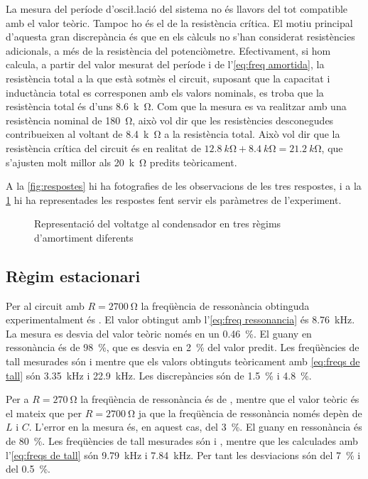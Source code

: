 La mesura del període d'osci\l.lació del sistema no és llavors del tot compatible amb el valor teòric. Tampoc ho és el de la resistència crítica. El motiu principal d'aquesta gran discrepància és que en els càlculs no s'han considerat resistències adicionals, a més de la resistència del potenciòmetre. Efectivament, si hom calcula, a partir del valor mesurat del període i de l'\cref{eq:freq amortida}, la resistència total a la que està sotmès el circuit, suposant que la capacitat i inductància total es corresponen amb els valors nominals, es troba que la resistència total és d'uns \SI{8.6}{k\ohm}. Com que la mesura es va realitzar amb una resistència nominal de \SI{180}{\ohm}, això vol dir que les resistències desconegudes contribueixen al voltant de \SI{8.4}{k\ohm} a la resistència total. Això vol dir que la resistència crítica del circuit és en realitat de \( \SI{12.8}{k\ohm} + \SI{8.4}{k\ohm} = \SI{21.2}{k\ohm} \), que s'ajusten molt millor als \SI{20}{k\ohm} predits teòricament.  

A la \cref{fig:respostes} hi ha fotografies de les observacions de les tres respostes, i a la \cref{fig:oscilacions} hi ha representades les respostes fent servir els paràmetres de l'experiment. 

\begin{figure}[hbt]
	\centering \small \sffamily
	
	\caption{Representació del voltatge al condensador en tres règims d'amortiment diferents}
	\label{fig:oscilacions}
\end{figure}

\subsection{Règim estacionari}
Per al circuit amb \( R = \SI{2700}{\ohm} \) la freqüència de ressonància obtinguda experimentalment és . El valor obtingut amb l'\cref{eq:freq ressonancia} és \SI{8.76}{kHz}. La mesura es desvia del valor teòric només en un \SI{0.46}{\percent}. El guany en ressonància és de \SI{98}{\percent}, que es desvia en \SI{2}{\percent} del valor predit. Les freqüències de tall mesurades són  i  mentre que els valors obtinguts teòricament amb \cref{eq:freqs de tall} són \SI{3.35}{kHz} i \SI{22.9}{kHz}. Les discrepàncies són de \SI{1.5}{\percent} i \SI{4.8}{\percent}.

Per a \( R = \SI{270}{\ohm} \) la freqüència de ressonància és de , mentre que el valor teòric és el mateix que per \( R = \SI{2700}{\ohm} \) ja que la freqüència de ressonància només depèn de \( L \) i \( C \). L'error en la mesura és, en aquest cas, del \SI{3}{\percent}.  El guany en ressonància és de \SI{80}{\percent}. Les freqüències de tall mesurades són  i , mentre que les calculades amb l'\cref{eq:freqs de tall} són \SI{9.79}{kHz} i \SI{7.84}{kHz}. Per tant les desviacions són del \SI{7}{\percent} i del \SI{0.5}{\percent}. 

